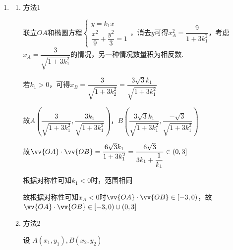 \begin{enumerate}
\begin{jieda}
\begin{enumerate}
            所以椭圆 $C$ 的方程为 $\dfrac{{x}^{2}}{9} + \dfrac{{y}^{2}}{3} = 1$ .
            \item 
            \begin{enumerate}
                \item 方法1

                联立$OA$和椭圆方程$\left\{\begin{array}{l}
                     y = k_1x  \\
                     \dfrac{{x}^{2}}{9} + \dfrac{{y}^{2}}{3} = 1 
                \end{array}\right.$，消去$y$可得$x_A^2 = \dfrac{9}{1+3k_1^2}$，考虑$x_A = \dfrac{3}{\sqrt{1+3k_1^2}}$的情况，另一种情况数量积为相反数.
                
                若$k_1>0$，可得$x_B = \dfrac{3}{\sqrt{1+3k_2^2}} = \dfrac{3\sqrt{3}k_1}{\sqrt{1+3k_1^2}}$

                故$A\left(\dfrac{3}{\sqrt{1+3k_1^2}}, \dfrac{3k_1}{\sqrt{1+3k_1^2}}\right)$，$B\left(\dfrac{3\sqrt{3}k_1}{\sqrt{1+3k_1^2}}, \dfrac{-\sqrt{3}}{\sqrt{1+3k_1^2}}\right)$

                故$\vv{OA} \cdot \vv{OB} = \dfrac{6\sqrt{3}k_1}{1+3k_1^2} = \dfrac{6\sqrt{3}}{3k_1+\dfrac{1}{k_1}} \in (0, 3]$

                根据对称性可知$k_1 < 0$时，范围相同

                故根据对称性可知$x_A < 0$时$\vv{OA} \cdot \vv{OB} \in \left\lbrack -3,0\right)$，故$\vv{OA} \cdot \vv{OB} \in \left\lbrack  {-3,0)\cup (0,3}\right\rbrack$

                \item 方法2

                设 $A\left( {{x}_{1},{y}_{1}}\right) ,B\left( {{x}_{2},{y}_{2}}\right)$
\end{enumerate}
\end{enumerate}
\end{jieda}
\end{enumerate}
